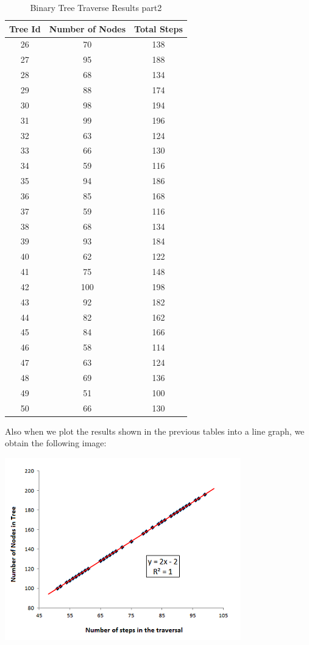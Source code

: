 \documentclass[12p]{article}
\begin{document}
\begin{table}[ht]
\caption{Binary Tree Traverse Results part2}				%
\centering 									%
\begin{tabular}{c c c} 							%
\hline\hline 									%
Tree Id & Number of Nodes & Total Steps\\ [0.5ex] 			%
\hline %
26 & 70 & 138 \\
27 & 95 & 188 \\
28 & 68 & 134 \\
29 & 88 & 174 \\
30 & 98 & 194 \\
31 & 99 & 196 \\
32 & 63 & 124 \\
33 & 66 & 130 \\
34 & 59 & 116 \\
35 & 94 & 186 \\
36 & 85 & 168 \\
37 & 59 & 116 \\
38 & 68 & 134 \\
39 & 93 & 184 \\
40 & 62 & 122 \\
41 & 75 & 148 \\
42 & 100 & 198 \\
43 & 92 & 182 \\
44 & 82 & 162 \\
45 & 84 & 166 \\
46 & 58 & 114 \\
47 & 63 & 124 \\
48 & 69 & 136 \\
49 & 51 & 100 \\
50 & 66 & 130 \\ [1ex] 						%
\hline %
\end{tabular}
\label{table:nonlin} %
\end{table}

  \newpage 				%
  \newpage 				%


\large Also when we plot the results shown in the previous tables into a line graph, we obtain the following image:

\includegraphics{Graph2}
\end{document}

